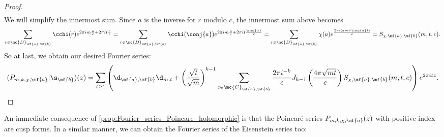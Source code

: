 \begin{proof}
\begin{align*}
      \end{align*}
      We will simplify the innermost sum. Since $a$ is the inverse for $r$ modulo $c$, the innermost sum above becomes
      \[
        \sum_{r \in \mc{D}_{\mf{a},\mf{b}}}\cchi(r)e^{2\pi im\frac{a}{c}+2\pi it\frac{r}{c}} = \sum_{r \in \mc{D}_{\mf{a},\mf{b}}}\cchi(\conj{a})e^{2\pi im\frac{a}{c}+2\pi it\frac{\conj{a}}{c}} = \sum_{r \in \mc{D}_{\mf{a},\mf{b}}}\chi(a)e^{\frac{2\pi i(am+\conj{a}t)}{c}} = S_{\chi,\mf{a},\mf{b}}(m,t,c).
      \]
      So at last, we obtain our desired Fourier series:
      \[
        (P_{m,k,\chi,\mf{a}}|\s_{\mf{b}})(z) = \sum_{t \ge 1}\left(\d_{\mf{a},\mf{b}}\d_{m,t}+\left(\frac{\sqrt{t}}{\sqrt{m}}\right)^{k-1}\sum_{\substack{c \in \mc{C}_{\mf{a},\mf{b}}}}\frac{2\pi i^{-k}}{c}J_{k-1}\left(\frac{4\pi\sqrt{mt}}{c}\right)S_{\chi,\mf{a},\mf{b}}(m,t,c)\right)e^{2\pi itz}.
      \]
    \end{proof}

    An immediate consequence of \cref{prop:Fourier_series_Poincare_holomorphic} is that the Poincar\'e series $P_{m,k,\chi,\mf{a}}(z)$ with positive index are cusp forms. In a similar manner, we can obtain the Fourier series of the Eisenstein series too:
    
